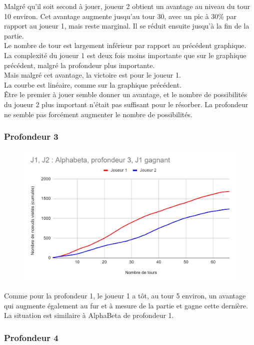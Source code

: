 \documentclass[12pt]{article}
\begin{document}
Malgré qu’il soit second à jouer, joueur 2 obtient un avantage au niveau du tour 10 environ. Cet avantage augmente jusqu’au tour 30, avec un pic à 30\% par rapport au joueur 1, mais reste marginal. Il se réduit ensuite jusqu’à la fin de la partie.\\
Le nombre de tour est largement inférieur par rapport au précédent graphique. La complexité du joueur 1 est deux fois moins importante que sur le graphique précédent, malgré la profondeur plus importante.\\
Mais malgré cet avantage, la victoire est pour le joueur 1.\\
La courbe est linéaire, comme sur la graphique précédent.\\
Être le premier à jouer semble donner un avantage, et le nombre de possibilités du joueur 2 plus important n’était pas suffisant pour le résorber. La profondeur ne semble pas forcément augmenter le nombre de possibilités.
\newpage
\subsubsection{Profondeur 3}

\begin{figure}[!h]
   \includegraphics[width=\textwidth]{prof3alphabeta.png}
\end{figure}

Comme pour la profondeur 1, le joueur 1 a tôt, au tour 5 environ, un avantage qui augmente également au fur et à mesure de la partie et gagne cette dernière.\\
La situation est similaire à AlphaBeta de profondeur 1.
\newpage
\subsubsection{Profondeur 4}
\end{document}
